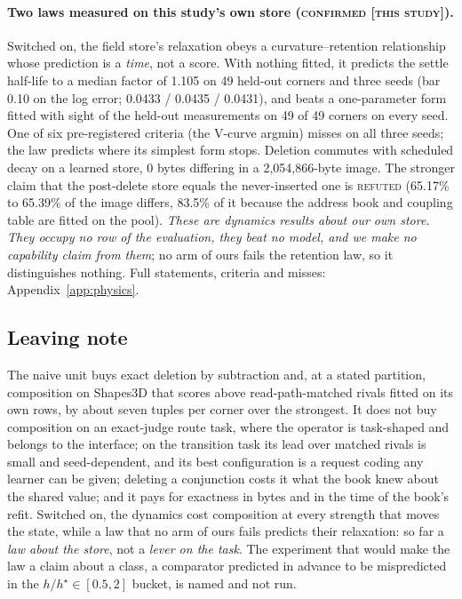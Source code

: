 \documentclass{article} %
\begin{document}
\paragraph{Two laws measured on this study's own store (\textsc{confirmed [this study]}).}
Switched on, the field store's relaxation obeys a curvature--retention relationship whose
prediction is a \emph{time}, not a score. With nothing fitted, it predicts the settle half-life to
a median factor of 1.105 on 49 held-out corners and three seeds (bar 0.10 on the log error; 0.0433
/ 0.0435 / 0.0431), and beats a one-parameter form fitted with sight of the held-out
measurements on 49 of 49 corners on every seed. One of six pre-registered criteria (the V-curve
argmin) misses on all three seeds; the law predicts where its simplest form stops.
Deletion commutes with scheduled decay on a learned store, 0 bytes differing in a
2,054,866-byte image. The stronger claim that the post-delete store equals the never-inserted one is \textsc{refuted} (65.17\% to 65.39\% of the image differs, 83.5\% of it because the
address book and coupling table are fitted on the pool). %
\emph{These are dynamics results about our own store. They occupy no row of the evaluation, they
beat no model, and we make no capability claim from them}; no arm of ours fails the retention law, so it distinguishes nothing. Full statements, criteria and misses: Appendix~\ref{app:physics}.

\subsection{Leaving note}
\label{sec:leaving}

The naive unit buys exact deletion by subtraction and, at a stated partition, composition on
Shapes3D that scores above read-path-matched rivals fitted on its own rows, by about seven tuples per
corner over the strongest. It does not buy composition on an exact-judge route task, where the
operator is task-shaped and belongs to the interface; on the transition task its lead over matched
rivals is small and seed-dependent, and its best configuration is a request coding any learner can be
given; deleting a conjunction costs it what the book knew about the shared value; and it pays for
exactness in bytes and in the time of the book's refit. Switched on, the dynamics cost composition at
every strength that moves the state, while a law that no arm of ours fails predicts their relaxation:
so far a \emph{law about the store}, not a \emph{lever on the task}. The experiment that would make
the law a claim about a class, a comparator predicted in advance to be mispredicted in the
$h/h^\star\in[0.5,2]$ bucket, is named and not run. %
\end{document}

